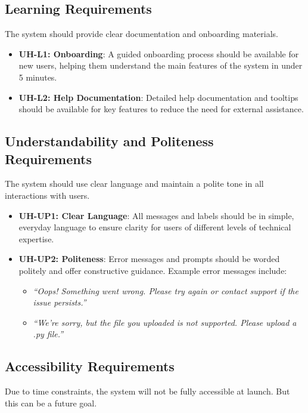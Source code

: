 \documentclass[12pt]{article}
\begin{document}
\subsection{Learning Requirements}
The system should provide clear documentation and onboarding materials.
\begin{itemize}
    \item \textbf{UH-L1: Onboarding}: A guided onboarding process should be available 
    for new users, helping them understand the main features of the system 
    in under 5 minutes.
    
    \item \textbf{UH-L2: Help Documentation}: Detailed help documentation and tooltips 
    should be available for key features to reduce the need for external 
    assistance.
\end{itemize}

\subsection{Understandability and Politeness Requirements}
The system should use clear language and maintain a polite tone in all 
interactions with users.
\begin{itemize}
    \item \textbf{UH-UP1: Clear Language}: All messages and labels should be in simple, 
    everyday language to ensure clarity for users of different levels of 
    technical expertise.
    
    \item \textbf{UH-UP2: Politeness}: Error messages and prompts should be worded 
    politely and offer constructive guidance. Example error messages include:
    \begin{itemize}
        \item \textit{“Oops! Something went wrong. Please try again or contact 
        support if the issue persists.”}
        \item \textit{“We're sorry, but the file you uploaded is not supported. 
        Please upload a .py file.”}
    \end{itemize}
\end{itemize}

\subsection{Accessibility Requirements}
Due to time constraints, the system will not be fully accessible at launch. But this can be a future goal.
\end{document}
